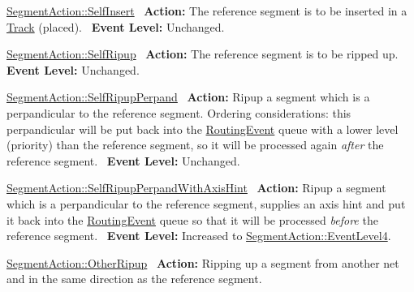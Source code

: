 \begin{DoxyItemize}
\item \hyperlink{classKite_1_1SegmentAction_a1d1cfd8ffb84e947f82999c682b666a7a930d0718b2afc37983ffe708f8261b19}{Segment\+Action\+::\+Self\+Insert}~\newline
 {\bfseries Action\+:} The reference segment is to be inserted in a \hyperlink{classKite_1_1Track}{Track} (placed).~\newline
 {\bfseries Event Level\+:} Unchanged.
\item \hyperlink{classKite_1_1SegmentAction_a1d1cfd8ffb84e947f82999c682b666a7a837e07a8b4101cff32018683072f2d78}{Segment\+Action\+::\+Self\+Ripup}~\newline
 {\bfseries Action\+:} The reference segment is to be ripped up.~\newline
 {\bfseries Event Level\+:} Unchanged.
\item \hyperlink{classKite_1_1SegmentAction_a1d1cfd8ffb84e947f82999c682b666a7a85fd77114c99a0827e08de2fc6a53ed7}{Segment\+Action\+::\+Self\+Ripup\+Perpand}~\newline
 {\bfseries Action\+:} Ripup a segment which is a perpandicular to the reference segment. Ordering considerations\+: this perpandicular will be put back into the \hyperlink{classKite_1_1RoutingEvent}{Routing\+Event} queue with a lower level (priority) than the reference segment, so it will be processed again {\itshape after} the reference segment.~\newline
 {\bfseries Event Level\+:} Unchanged.
\item \hyperlink{classKite_1_1SegmentAction_a1d1cfd8ffb84e947f82999c682b666a7ae30745ee276038ba4d7b5f92d80f3715}{Segment\+Action\+::\+Self\+Ripup\+Perpand\+With\+Axis\+Hint}~\newline
 {\bfseries Action\+:} Ripup a segment which is a perpandicular to the reference segment, supplies an axis hint and put it back into the \hyperlink{classKite_1_1RoutingEvent}{Routing\+Event} queue so that it will be processed {\itshape before} the reference segment.~\newline
 {\bfseries Event Level\+:} Increased to \hyperlink{classKite_1_1SegmentAction_a1d1cfd8ffb84e947f82999c682b666a7ab8346062d5bbccb98893c4675b8d5098}{Segment\+Action\+::\+Event\+Level4}.
\item \hyperlink{classKite_1_1SegmentAction_a1d1cfd8ffb84e947f82999c682b666a7a22374bab829fac7d12af4784d80eeb6e}{Segment\+Action\+::\+Other\+Ripup}~\newline
 {\bfseries Action\+:} Ripping up a segment from another net and in the same direction as the reference segment.~\newline

\end{DoxyItemize}
